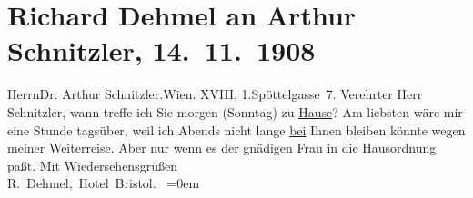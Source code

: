 

         
         \renewcommand{\erwaehntePersonen}{Personen: Richard Dehmel, Olga Schnitzler}
         \renewcommand{\erwaehnteOrte}{Orte: Edmund-Weiß-Gasse, Hotel Bristol, I., Innere Stadt, Wien, XVIII., Währing}
         \renewcommand{\erwaehnteWerke}{}
               \section[Richard Dehmel an Arthur Schnitzler, 14. 11. 1908]{ Richard Dehmel an Arthur Schnitzler, 14. 11. 1908}\nopagebreak{}\rehead{ }\begin{ledgroupsized}[t]{13cm}\normalsize\beginnumbering \toendnotes[C]{\smallbreak\pagebreak[2]} 
\pstart{}{\pb}Herrn\pend{}\pstart{}Dr. Arthur Schnitzler.\pend{}\pstart{}Wien. XVIII, 1.\pend{}\pstart{}Spöttelgasse 7.\pend{}{\bigskip}\pstart
           \noindent{}{\pb}Verehrter Herr Schnitzler, wann treffe ich Sie morgen
                  (Sonntag) zu \uline{Hause}? Am liebsten wäre
               mir eine Stunde tagsüber, weil ich Abends  nicht lange \uline{bei} Ihnen bleiben könnte
               wegen meiner Weiterreise. Aber nur wenn es der gnädigen Frau in die Hausordnung paßt.\pend
           \pstart
           Mit Wiedersehensgrüßen{\\[\baselineskip]}\spacefill\mbox{R. Dehmel, Hotel Bristol.
               }\pend
           \leftskip=0em{}
         
         \endnumbering{}\end{ledgroupsized}  \newcommand{\dateiname}{L01801}\newcommand{\titel}{Richard Dehmel an Arthur Schnitzler, 14. 11. 1908}\newcommand{\editorInnen}{Martin Anton Müller und Gerd-Hermann Susen}
      